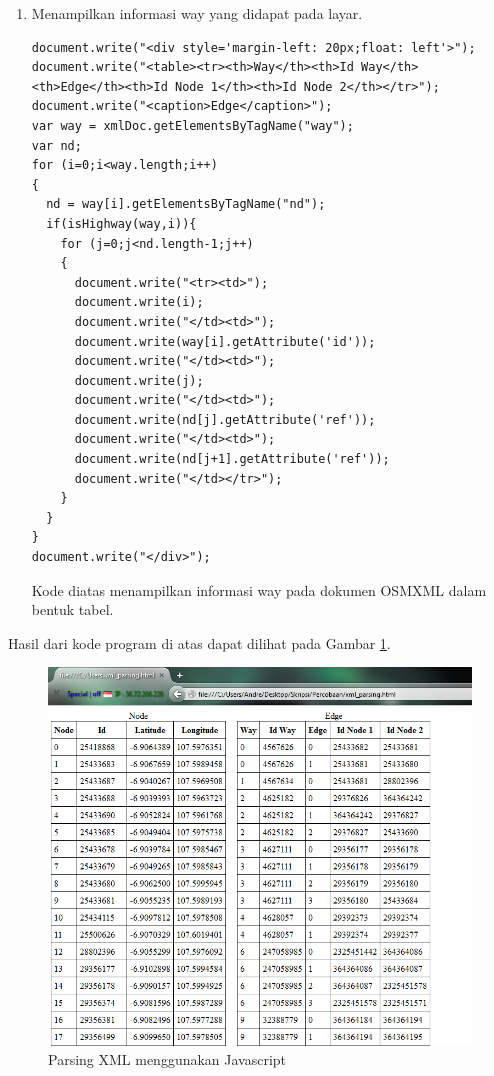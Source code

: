 \begin{enumerate}
	\item Menampilkan informasi way yang didapat pada layar.
\begin{verbatim}
document.write("<div style='margin-left: 20px;float: left'>");
document.write("<table><tr><th>Way</th><th>Id Way</th>
<th>Edge</th><th>Id Node 1</th><th>Id Node 2</th></tr>");
document.write("<caption>Edge</caption>");
var way = xmlDoc.getElementsByTagName("way");
var nd;
for (i=0;i<way.length;i++)
{
  nd = way[i].getElementsByTagName("nd");
  if(isHighway(way,i)){
    for (j=0;j<nd.length-1;j++)
    {
      document.write("<tr><td>");
      document.write(i);
      document.write("</td><td>");
      document.write(way[i].getAttribute('id'));
      document.write("</td><td>");
      document.write(j);
      document.write("</td><td>");
      document.write(nd[j].getAttribute('ref'));
      document.write("</td><td>");
      document.write(nd[j+1].getAttribute('ref'));	
      document.write("</td></tr>");
    }
  }
}
document.write("</div>");
\end{verbatim}
Kode diatas menampilkan informasi way pada dokumen OSMXML dalam bentuk tabel.
\end{enumerate}
Hasil dari kode program di atas dapat dilihat pada Gambar \ref{fig:xml_parsing}.
\begin{figure}[h]
\centering
\includegraphics[scale=0.5]{Gambar/xml_parsing}
\caption[Parsing XML menggunakan Javascript]{Parsing XML menggunakan
Javascript}
\label{fig:xml_parsing}
\end{figure}

